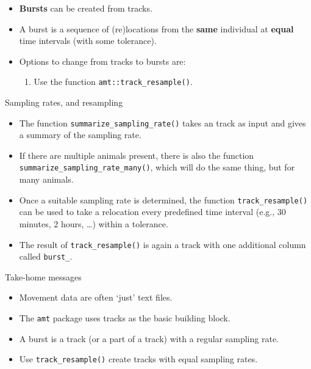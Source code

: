 \documentclass[ignorenonframetext,,t]{beamer}
\let\oldtextbf\textbf
\renewcommand{\textbf}[1]{\textcolor{spamwell}{\oldtextbf{#1}}}
\providecommand{\tightlist}{%
\setlength{\itemsep}{0pt}\setlength{\parskip}{0pt}}
\providecommand{\tightlist}{%
\setlength{\itemsep}{0pt}\setlength{\parskip}{0pt}}
\renewcommand{\tightlist}{\setlength{\itemsep}{1.4ex}\setlength{\parskip}{0pt}}
\begin{document}
\begin{frame}[fragile]
\begin{itemize}
\tightlist
\item
  \textbf{Bursts} can be created from tracks.
\item
  A burst is a sequence of (re)locations from the \textbf{same}
  individual at \textbf{equal} time intervals (with some tolerance).
\item
  Options to change from tracks to bursts are:

  \begin{enumerate}
  \tightlist
  \item
    Use the function \texttt{amt::track\_resample()}.
  \end{enumerate}
\end{itemize}
\end{frame}

\begin{frame}[fragile]{Sampling rates, and resampling}
\protect\hypertarget{sampling-rates-and-resampling}{}
\begin{itemize}
\tightlist
\item
  The function \texttt{summarize\_sampling\_rate()} takes an track as
  input and gives a summary of the sampling rate.
\item
  If there are multiple animals present, there is also the function
  \texttt{summarize\_sampling\_rate\_many()}, which will do the same
  thing, but for many animals.
\end{itemize}
\end{frame}

\begin{frame}[fragile]
\begin{itemize}
\tightlist
\item
  Once a suitable sampling rate is determined, the function
  \texttt{track\_resample()} can be used to take a relocation every
  predefined time interval (e.g., 30 minutes, 2 hours, \ldots) within a
  tolerance.
\item
  The result of \texttt{track\_resample()} is again a track with one
  additional column called \texttt{burst\_}.
\end{itemize}
\end{frame}

\begin{frame}[fragile]{Take-home messages}
\protect\hypertarget{take-home-messages}{}
\begin{itemize}
\tightlist
\item
  Movement data are often `just' text files.
\item
  The \texttt{amt} package uses tracks as the basic building block.
\item
  A burst is a track (or a part of a track) with a regular sampling
  rate.
\item
  Use \texttt{track\_resample()} create tracks with equal sampling
  rates.
\end{itemize}
\end{frame}
\end{document}
